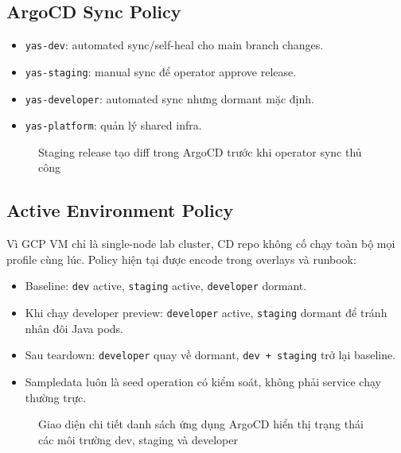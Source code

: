 

\subsection{ArgoCD Sync Policy}

\begin{itemize}
    \item \texttt{yas-dev}: automated sync/self-heal cho main branch changes.
    \item \texttt{yas-staging}: manual sync để operator approve release.
    \item \texttt{yas-developer}: automated sync nhưng dormant mặc định.
    \item \texttt{yas-platform}: quản lý shared infra.
\end{itemize}

\begin{figure}[H]
\centering
{}
\caption{Staging release tạo diff trong ArgoCD trước khi operator sync thủ công}
\end{figure}

\subsection{Active Environment Policy}

Vì GCP VM chỉ là single-node lab cluster, CD repo không cố chạy toàn bộ mọi profile cùng
lúc. Policy hiện tại được encode trong overlays và runbook:

\begin{itemize}
    \item Baseline: \texttt{dev} active, \texttt{staging} active, \texttt{developer} dormant.
    \item Khi chạy developer preview: \texttt{developer} active, \texttt{staging} dormant để tránh nhân đôi Java pods.
    \item Sau teardown: \texttt{developer} quay về dormant, \texttt{dev + staging} trở lại baseline.
    \item Sampledata luôn là seed operation có kiểm soát, không phải service chạy thường trực.
\end{itemize}

\begin{figure}[H]
\centering
{}
\caption{Giao diện chi tiết danh sách ứng dụng ArgoCD hiển thị trạng thái các môi trường dev, staging và developer}
\end{figure}
